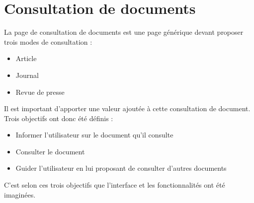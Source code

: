 \section{Consultation de documents}
\label{sec:consultation}

La page de consultation de documents est une page générique devant proposer trois modes de consultation :
\begin{itemize}
\item Article
\item Journal
\item Revue de presse
\end{itemize}

Il est important d’apporter une valeur ajoutée à cette consultation de document. Trois objectifs ont donc été définis :
\begin{itemize}
\item Informer l’utilisateur sur le document qu’il consulte
\item Consulter le document
\item Guider l’utilisateur en lui proposant de consulter d’autres documents
\end{itemize}
C’est selon ces trois objectifs que l’interface et les fonctionnalités ont été imaginées.


